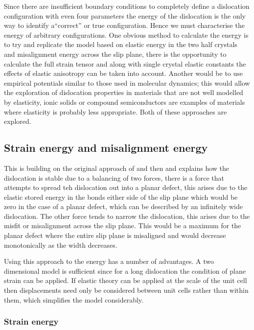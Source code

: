 Since there are insufficient boundary conditions to completely define a dislocation configuration with even four parameters the energy of the dislocation is the only way to identify a``correct'' or true configuration. Hence we must characterise the energy of arbitrary configurations. One obvious method to calculate the energy is to try and replicate the model based on elastic energy in the two half crystals and misalignment energy across the slip plane, there is the opportunity to calculate the full strain tensor and along with single crystal elastic constants the effects of elastic anisotropy can be taken into account. Another would be to use empirical potentials similar to those used in molecular dynamics; this would allow the exploration of dislocation properties in materials that are not well modelled by elasticity, ionic solids or compound semiconductors are examples of materials where elasticity is probably less appropriate. Both of these approaches are explored.

\subsection{Strain energy and misalignment energy}

This is building on the original approach of \citet{Peierls1940} and then \citet{Nabarro1947} and explains how the dislocation is stable due to a balancing of two forces, there is a force that attempts to spread teh dislocation out into a planar defect, this arises due to the elastic stored energy in the bonds either side of the slip plane which would be zero in the case of a planar defect, which can be described by an infinitely wide dislocation. The other force tends to narrow the dislocation, this arises due to the misfit or misalignment across the slip plane. This would be a maximum for the planar defect where the entire slip plane is misaligned and would decrease monotonically as the width decreases.

Using this approach to the energy has a number of advantages. A two dimensional model is sufficient since for a long dislocation the condition of plane strain can be applied. If elastic theory can be applied at the scale of the unit cell then displacements need only be considered between unit cells rather than within them, which simplifies the model considerably.

\subsubsection{Strain energy}

